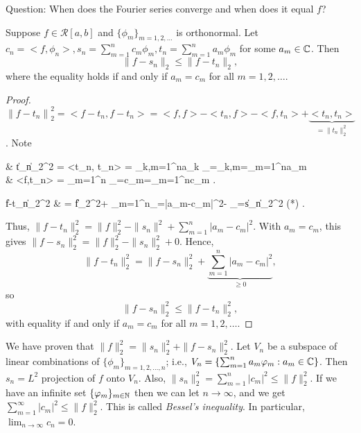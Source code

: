 Question: When does the Fourier series converge and when does it equal $f$?
\begin{thm}[11]
	Suppose $f \in \mathscr{R}[a,b]$ and $\{\phi_m\}_{m=1,2,\ldots }$ is orthonormal. Let $c_{n}= < f, \phi_n> , s_n= \sum_{m=1}^{n}{c_m \phi_m}, t_n= \sum_{m=1}^{n}{a_m \phi_m}$ for some $a_m \in \mathbb{C}$. Then
	\[
		\|f-s_n\|_{2} \le \|f-t_n\|_2
		,\] where the equality holds if and only if $a_m=c_m$ for all $m=1,2,\ldots $.
	\begin{proof}
		${\|f-t_n\|}_{2}^{2}= <f-t_n, f-t_n> = <f,f > - <t_n, f> - <f,t_n> + \underbrace{<t_n, t_n>}_{=\|t_n\|_{2}^{2}}$.
		Note
		\begin{flalign*}
			 & \|t_n\|_{2}^{2}  = <t_n, t_n> = \sum_{k,m=1}^{n}{a_k  _{=\delta_{k,m}}}=\sum_{m=1}^{n}{a_m }                                                                                 \tag{*} \\
			 & <f,t_n>          = \sum_{m=1}^{n}{ _{=c_m}}=\sum_{m=1}^{n}{c_m}
			.\end{flalign*}
		\begin{flalign*}
			\|f-t_n\|_{2}^{2} & = \|f\|_{2}^{2}+ \sum_{m=1}^{n}{_{=\left|a_m-c_m\right|^2}}- _{=\|s_n\|_{2}^2 \text{ by } (*)}
			.\end{flalign*}
		Thus, $\|f-t_n\|_{2}^2=\|f\|_{2}^2 - \|s_n\|^2+\sum_{m=1}^{n}{\left|a_m-c_m\right|^2}$. With $a_m=c_m$, this gives $\|f-s_n\|_{2}^2=\|f\|_2^{2}-\|s_n\|_{2}^2+0$.
		Hence,
		\[
			\|f-t_n\|_{2}^2=\|f-s_n\|_{2}^2+\underbrace{\sum_{m=1}^{n}{\left|a_m-c_m\right|^2}}_{\ge 0}
			,\]
		so \[
			\|f-s_n\|_{2}^2\le \|f-t_n\|_{2}^2
			,\] with equality if and only if $a_m=c_m$ for all $m=1,2,\ldots $.
	\end{proof}
	\begin{note}
		We have proven that $\|f\|_2^{2}=\|s_n\|_2^2+\|f-s_n\|_{2}^2$.
		Let $V_n$ be a subspace of linear combinations of $\{\phi_m\}_{m=1,2,\ldots ,n}$; i.e., $V_n=\left\{ \sum_{m=1}^{n}{a_m \varphi_m}: a_m \in \mathbb{C}\right\}$.
		Then $s_n=L^2$ projection of $f$ onto $V_n$. Also, $\|s_n\|_{2}^2=\sum_{m=1}^{n}{\left|c_m\right|^2}\le \|f\|_{2}^2$.
		If we have an infinite set $\{\varphi_m\}_{m \in \mathbb{N}}$ then we can let $n\to \infty$, and we get $\sum_{m=1}^{\infty}{\left|c_m\right|^2}\le \|f\|_2^{2}$.
		This is called \textit{Bessel's inequality}.
		In particular, $\lim_{n\to \infty}{c_n}=0$.
	\end{note}
\end{thm}

